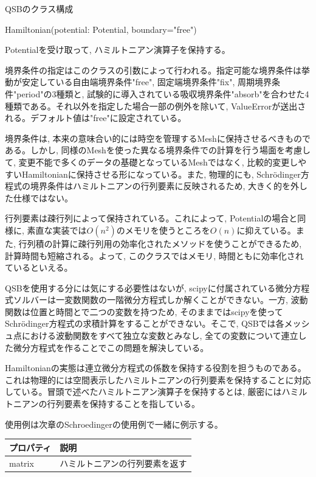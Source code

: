 \documentclass[a4paper, lualatex]{bxjsarticle}
\begin{document}
\begin{section}{QSBのクラス構成\label{AppQ}}
    \begin{subsection}{Hamiltonian(potential: Potential, boundary="free")}
        \par Potentialを受け取って, ハミルトニアン演算子を保持する。
        \par 境界条件の指定はこのクラスの引数によって行われる。指定可能な境界条件は挙動が安定している自由端境界条件"free", 固定端境界条件"fix", 周期境界条件"period"の3種類と, 試験的に導入されている吸収境界条件"absorb"を合わせた4種類である。それ以外を指定した場合一部の例外を除いて, ValueErrorが送出される。デフォルト値は"free"に設定されている。
        \par 境界条件は, 本来の意味合い的には時空を管理するMeshに保持させるべきものである。しかし, 同様のMeshを使った異なる境界条件での計算を行う場面を考慮して, 変更不能で多くのデータの基礎となっているMeshではなく, 比較的変更しやすいHamiltonianに保持させる形になっている。また, 物理的にも, Schrödinger方程式の境界条件はハミルトニアンの行列要素に反映されるため, 大きく的を外した仕様ではない。
        \par 行列要素は疎行列によって保持されている。これによって, Potentialの場合と同様に, 素直な実装では$O(n^2)$のメモリを使うところを$O(n)$に抑えている。また, 行列積の計算に疎行列用の効率化されたメソッドを使うことができるため, 計算時間も短縮される。よって, このクラスではメモリ, 時間ともに効率化されているといえる。
        \par QSBを使用する分には気にする必要性はないが, scipyに付属されている微分方程式ソルバーは一変数関数の一階微分方程式しか解くことができない。一方, 波動関数は位置と時間とで二つの変数を持つため, そのままではscipyを使ってSchrödinger方程式の求積計算をすることができない。そこで, QSBでは各メッシュ点における波動関数をすべて独立な変数とみなし, 全ての変数について連立した微分方程式を作ることでこの問題を解決している。
        \par Hamiltonianの実態は連立微分方程式の係数を保持する役割を担うものである。これは物理的には空間表示したハミルトニアンの行列要素を保持することに対応している。冒頭で述べたハミルトニアン演算子を保持するとは, 厳密にはハミルトニアンの行列要素を保持することを指している。
        \par 使用例は次章のSchroedingerの使用例で一緒に例示する。
        \begin{table}[h]
            \begin{tabular}{ll}
                プロパティ & 説明\\ \hline
                matrix & ハミルトニアンの行列要素を返す\\
            \end{tabular}
        \end{table}
    \end{subsection}


\end{section}
\end{document}
